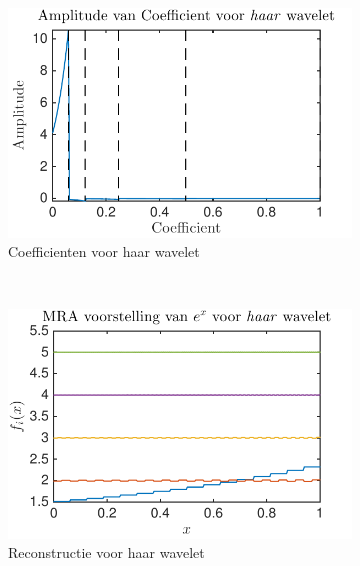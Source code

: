 \begin{figure}
    \centering
     \begin{subfigure}[b]{0.4\textwidth}
            \includegraphics[width=\textwidth]{../src/denoising/haar_noNoise/coef_exp_haar_4}
            \caption{Coefficienten voor haar wavelet}
        \end{subfigure}
        ~ %
        \begin{subfigure}[b]{0.4\textwidth}
            \includegraphics[width=\textwidth]{../src/denoising/haar_noNoise/MRA_exp_haar_4}
            \caption{Reconstructie voor haar wavelet}
        \end{subfigure}
    \begin{subfigure}[b]{0.4\textwidth}

\end{subfigure}
\end{figure}
